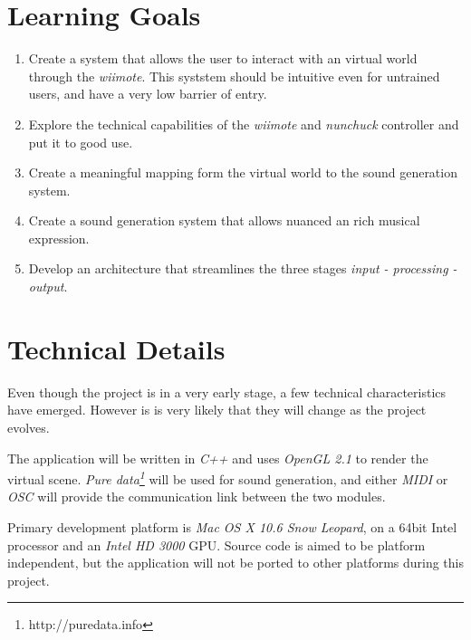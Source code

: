 \documentclass[10pt,a4paper]{scrartcl}
\begin{document}
\section{Learning Goals}
\begin{enumerate}
\item Create a system that allows the user to interact with an virtual world through the \emph{wiimote}. This syststem should be intuitive even for untrained users, and have a very low barrier of entry.
\item Explore the technical capabilities of the \emph{wiimote} and \emph{nunchuck} controller and put it to good use.
\item Create a meaningful mapping form the virtual world to the sound generation system.
\item Create a sound generation system that allows nuanced an rich musical expression.
\item Develop an architecture that streamlines the three stages \emph{input - processing - output}.
\end{enumerate}

\section{Technical Details}
Even though the project is in a very early stage, a few technical characteristics have emerged. However is is very likely that they will change as the project evolves.

The application will be written in \emph{C++} and uses \emph{OpenGL 2.1} to render the virtual scene. \emph{Pure data\footnote{http://puredata.info}} will be used for sound generation, and either \emph{MIDI} or \emph{OSC} will provide the communication link between the two modules.

Primary development platform is \emph{Mac OS X 10.6 Snow Leopard}, on a 64bit Intel processor and an \emph{Intel HD 3000} GPU. Source code is aimed to be platform independent, but the application will not be ported to other platforms during this project. 

\nocite{*}



\end{document}
